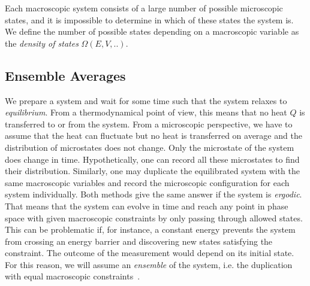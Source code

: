Each macroscopic system consists of a large number of possible microscopic states, and it is impossible to determine in which of these states the system is. We define the number of possible states depending on a macroscopic variable as the  \textit{density of states} $\Omega(E,V,..)$. 

\subsection{Ensemble Averages}
\label{sec:EnsembleAv}
We prepare a system and wait for some time such that the system relaxes to \textit{equilibrium}. From a thermodynamical point of view, this means that no heat $Q$ is transferred to or from the system. From a microscopic perspective, we have to assume that the heat can fluctuate but no heat is transferred on average and the distribution of microstates does not change. Only the microstate of the system does change in time.  Hypothetically, one can record all these microstates to find their distribution. Similarly, one may duplicate the equilibrated system with the same macroscopic variables and record the microscopic configuration for each system individually. Both methods give the same answer if the system is \textit{ergodic}. That means that the system can evolve in time and reach any point in phase space with given macroscopic constraints by only passing through allowed states. This can be problematic if, for instance, a constant energy prevents the system from crossing an energy barrier and discovering new states satisfying the constraint. The outcome of the measurement would depend on its initial state. For this reason, we will assume an \textit{ensemble} of the system, i.e. the duplication with equal macroscopic constraints~\cite{StatMech}. 

